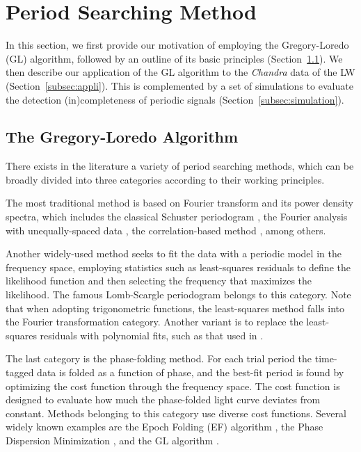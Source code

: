 \documentclass[fleqn,usenatbib]{mnras}
\begin{document}
\section{Period Searching Method}\label{sec:methods}
In this section, we first provide our motivation of employing the Gregory-Loredo (GL) algorithm, followed by an outline of its basic principles (Section~\ref{subsec:GL}). We then describe our application of the GL algorithm to the {\it Chandra} data of the LW (Section~\ref{subsec:appli}). This is complemented by a set of simulations to evaluate the detection (in)completeness of periodic signals (Section~\ref{subsec:simulation}).  

\subsection{The Gregory-Loredo Algorithm} \label{subsec:GL}
There exists in the literature a variety of period searching methods, which can be broadly divided into three categories according to their working principles. 

The most traditional method is based on Fourier transform and its power density spectra, which includes the classical Schuster periodogram \citep{1898TeMag...3...13S}, the Fourier analysis with unequally-spaced data \citep{1975Ap&SS..36..137D}, the correlation-based method \citep{1988ApJ...333..646E}, among others.

Another widely-used method seeks to fit the data with a periodic model in the frequency space, employing statistics such as least-squares residuals to define the likelihood function and then selecting the frequency that maximizes the likelihood. The famous Lomb-Scargle periodogram \citep[hereafter LS]{1976Ap&SS..39..447L,1982ApJ...263..835S} belongs to this category. Note that when adopting trigonometric functions, the least-squares method falls into the Fourier transformation category. Another variant is to replace the least-squares residuals with polynomial fits, such as that used in \citet{1996ApJ...460L.107S}.

The last category is the phase-folding method. For each trial period the time-tagged data is folded as a function of phase, and the best-fit period is found by optimizing the cost function through the frequency space. The cost function is designed to evaluate how much the phase-folded light curve deviates from constant.
Methods belonging to this category use diverse cost functions. Several widely known examples are the Epoch Folding (EF) algorithm \citep{1983ApJ...266..160L}, the Phase Dispersion Minimization \citep{1978ApJ...224..953S}, and the GL algorithm \citep{1992ApJ...398..146G}.
\end{document}
